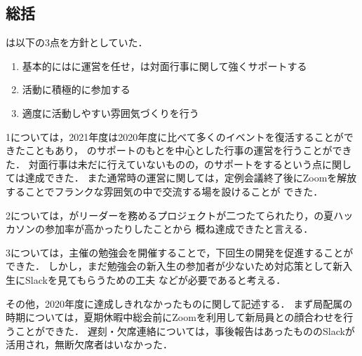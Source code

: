 \subsection*{\newGradeIfKouki{}\thirdGrade{}総括}


\thirdGrade{}は以下の3点を方針としていた．

\begin{enumerate}
    \item 基本的には\secondGrade{}に運営を任せ，\thirdGrade{}は対面行事に関して強くサポートする
    \item 活動に積極的に参加する
    \item 適度に活動しやすい雰囲気づくりを行う
\end{enumerate}


1については，2021年度は2020年度に比べて多くのイベントを復活することができたこともあり，
\thirdGrade{}のサポートのもと\secondGrade{}を中心とした行事の運営を行うことができた．
対面行事は未だに行えていないものの，\secondGrade{}のサポートをするという点に関しては達成できた．
また通常時の運営に関しては，定例会議終了後にZoomを解放することでフランクな雰囲気の中で交流する場を設けることが
できた．

2については，\thirdGrade{}がリーダーを務めるプロジェクトが二つたてられたり，\thirdGrade{}の夏ハッカソンの参加率が高かったりしたことから
概ね達成できたと言える．

3については，\thirdGrade{}主催の勉強会を開催することで，下回生の開発を促進することができた．
しかし，まだ勉強会の新入生の参加者が少ないため対応策として新入生にSlackを見てもらうための工夫
などが必要であると考える．

その他，2020年度に達成しきれなかったものに関して記述する．
まず局配属の時期については，夏期休暇中総会前にZoomを利用して新局員との顔合わせを行うことができた．
遅刻・欠席連絡については，事後報告はあったもののSlackが活用され，無断欠席者はいなかった．

